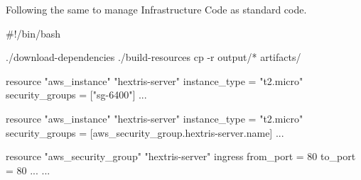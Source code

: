 \documentclass{slide}
\begin{document}

%
{Following the same  to manage Infrastructure Code as standard code.}




\begin{frame}[fragile]
\begin{code}[language=shell]{}
#!/bin/bash

./download-dependencies
./build-resources
cp -r output/* artifacts/
\end{code}

\end{frame}

\begin{frame}[fragile]
\begin{code}[language=terraform]{}
resource "aws_instance" "hextris-server" {
    instance_type = "t2.micro"
    security_groups = ["sg-6400"]
    ...
}
\end{code}
\end{frame}

\begin{frame}[fragile]
\begin{code}[language=terraform]{}
resource "aws_instance" "hextris-server" {
    instance_type = "t2.micro"
    security_groups = [aws_security_group.hextris-server.name]
    ...
}

resource "aws_security_group" "hextris-server" {
    ingress {
        from_port = 80
        to_port = 80
        ...
    }
    ...
}
\end{code}
\end{frame}





\end{document}
